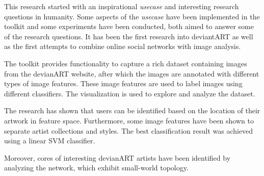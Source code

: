 This research started with an inspirational \textit{usecase} and interesting research questions in humanity.
Some aspects of the \textit{usecase} have been implemented in the toolkit and some experiments have been conducted, both aimed to answer some of the research questions.
It has been the first research into deviantART as well as the first attempts to combine online social networks with image analysis.

The toolkit provides functionality to capture a rich dataset containing images from the devianART website, after which the images are annotated with different types of image features. These image features are used to label images using different classifiers. The visualization is used to explore and analyze the dataset.

The research has shown that users can be identified based on the location of their artwork in feature space. Furthermore, some image features have been shown to separate artist collections and styles. The best classification result was achieved using a linear SVM classifier.

Moreover, cores of interesting devianART artists have been identified by analyzing the network, which exhibit small-world topology. 
